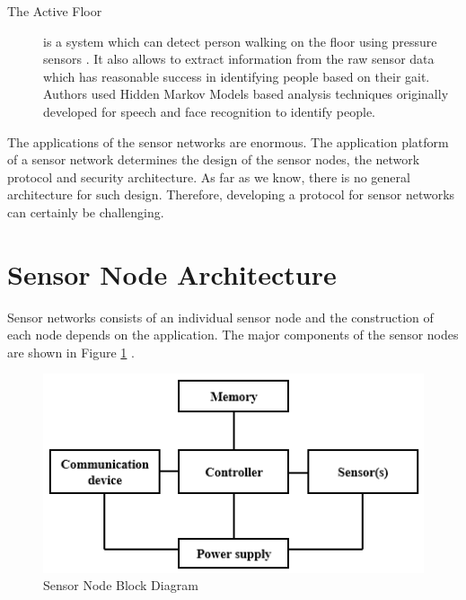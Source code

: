 \begin{description}
		\item[The Active Floor]
			is a system which can detect person walking on the floor using pressure sensors \cite{addlesee1997orl}.
			It also allows to extract information from the raw sensor data which has reasonable success in identifying people based on their gait.
			Authors used Hidden Markov Models based analysis techniques originally developed for speech and face recognition to identify people.
		
	\end{description}
	
	The applications of the sensor networks are enormous. 
	The application platform of a sensor network determines the design of the sensor nodes, the network protocol and security architecture.
	As far as we know, there is no general architecture for such design.
	Therefore, developing a protocol for sensor networks can certainly be challenging. 

\section{Sensor Node Architecture}
	Sensor networks consists of an individual sensor node and the construction of each node depends on the application.
	The major components of the sensor nodes are shown in Figure \ref{fig:sensor-node-architecture} \cite{karl2007protocols}.
	\begin{figure}[h!]
		\centering
		\includegraphics{images/sensor-node-architecture.png}
		\caption{Sensor Node Block Diagram}
		\label{fig:sensor-node-architecture}
	\end{figure}

